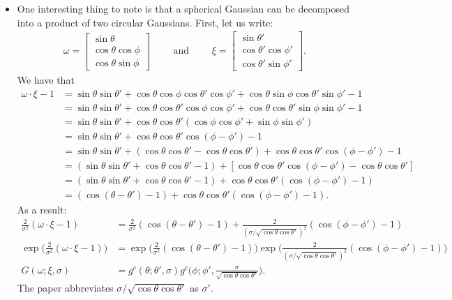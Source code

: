\documentclass[10pt]{article}
\begin{document}
\begin{itemize}
    \item One interesting thing to note is that a spherical Gaussian can be decomposed into a product of two circular Gaussians.  First, let us write:
    \begin{align*}
      \omega = \begin{bmatrix}
        \sin\theta \\
        \cos\theta\cos\phi \\
        \cos\theta\sin\phi
      \end{bmatrix}
      \qquad\mbox{ and }\qquad
      \xi = \begin{bmatrix}
        \sin\theta' \\
        \cos\theta'\cos\phi' \\
        \cos\theta'\sin\phi'
      \end{bmatrix}.
    \end{align*}
    We have that
    \begin{align*}
      \omega \cdot \xi - 1
      &= \sin\theta \sin\theta' 
      + \cos\theta\cos\phi\cos\theta'\cos\phi' 
      + \cos\theta\sin\phi\cos\theta'\sin\phi' - 1\\
      &= \sin\theta \sin\theta' 
      + \cos\theta\cos\theta'\cos\phi\cos\phi' 
      + \cos\theta\cos\theta'\sin\phi\sin\phi' - 1\\
      &= \sin\theta \sin\theta' 
      + \cos\theta\cos\theta'(\cos\phi\cos\phi' + \sin\phi\sin\phi')\\
      &= \sin\theta \sin\theta' 
      + \cos\theta\cos\theta'\cos(\phi - \phi') - 1\\
      &= \sin\theta \sin\theta' + (\cos\theta\cos\theta' - \cos\theta\cos\theta')
      + \cos\theta\cos\theta'\cos(\phi - \phi') - 1\\
      &= (\sin\theta \sin\theta' + \cos\theta\cos\theta' -1) 
      + [\cos\theta\cos\theta'\cos(\phi - \phi') - \cos\theta\cos\theta'] \\
      &= (\sin\theta \sin\theta' + \cos\theta\cos\theta' -1) 
      + \cos\theta\cos\theta'(\cos(\phi - \phi') - 1) \\
      &= (\cos(\theta - \theta') -1) 
      + \cos\theta\cos\theta'(\cos(\phi - \phi') - 1).
    \end{align*}
    As a result:
    \begin{align*}
      \frac{2}{\sigma^2}(\omega \cdot \xi - 1)
      &= \frac{2}{\sigma^2}(\cos(\theta-\theta')-1) + \frac{2}{(\sigma/\sqrt{\cos\theta\cos\theta'})^2} (\cos(\phi - \phi') - 1) \\
      \exp \bigg( \frac{2}{\sigma^2}(\omega \cdot \xi - 1) \bigg) 
      &= \exp\bigg( \frac{2}{\sigma^2}(\cos(\theta-\theta')-1) \bigg)
      \exp\bigg( \frac{2}{(\sigma/\sqrt{\cos\theta\cos\theta'})^2} (\cos(\phi - \phi') - 1) \bigg)\\
      G(\omega;\xi,\sigma) &= g^c(\theta;\theta',\sigma)g^c\bigg(\phi;\phi',\frac{\sigma}{\sqrt{\cos\theta\cos\theta'}}\bigg).
    \end{align*}
    The paper abbreviates $\sigma / \sqrt{\cos\theta\cos\theta'}$ as $\sigma'$.    
  \end{itemize}
\end{document}
